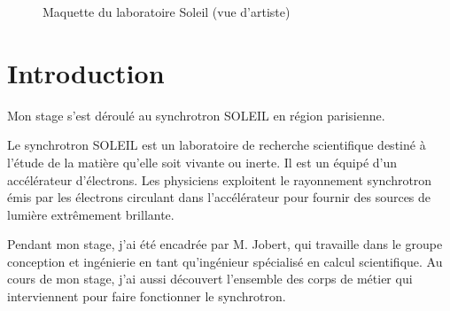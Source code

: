 


\begin{figure}
  \centering
  \caption{Maquette du laboratoire Soleil (vue d'artiste)}
\end{figure}
			
\section*{Introduction}



     Mon stage s'est déroulé au synchrotron SOLEIL en région parisienne. 



		
     Le synchrotron SOLEIL est un laboratoire de recherche scientifique destiné à l'étude de la matière qu'elle soit vivante ou inerte. Il est un équipé d'un accélérateur d'électrons. Les physiciens exploitent le rayonnement synchrotron émis par les électrons circulant dans l'accélérateur pour fournir des sources de lumière extrêmement brillante.

     Pendant mon stage, j'ai été encadrée par M. Jobert, qui travaille dans le groupe conception et ingénierie en tant qu'ingénieur spécialisé en calcul scientifique. Au cours de mon stage, j'ai aussi découvert l'ensemble des corps de métier qui interviennent pour faire fonctionner le synchrotron.
		
